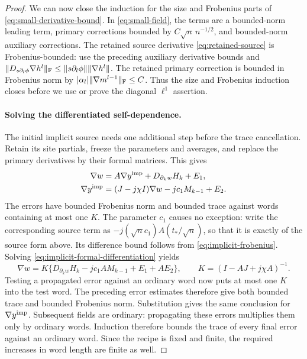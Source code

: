 \begin{proof}
We can now close the induction for the size and Frobenius parts of
\eqref{eq:small-derivative-bound}. In \eqref{eq:small-field}, the terms are a
bounded-norm leading term, primary corrections bounded by
$C\sqrt n\,n^{-1/2}$, and bounded-norm auxiliary corrections.
The retained source derivative \eqref{eq:retained-source} is
Frobenius-bounded: use the preceding auxiliary derivative bounds and
$\lVert D_{s\partial_l\phi}\nabla h^l\rVert_{\mathrm F}
\leq\lVert s\partial_l\phi\rVert\lVert \nabla h^l\rVert$.
The retained primary correction is bounded in Frobenius norm by
$|\alpha_l|\lVert \nabla m^{l-1}\rVert_{\mathrm F}\leq C$.
Thus the size and Frobenius induction closes before we use or prove
the diagonal $\ell^1$ assertion.

\paragraph{Solving the differentiated self-dependence.}
The initial implicit source needs one additional step before the trace
cancellation. Retain its site partials, freeze the parameters and
averages, and replace the primary derivatives by their formal matrices.
This gives
\begin{equation}
 \begin{split}
 \nabla w&=A\nabla y^{\rm imp}+D_{\partial_k w}H_k+E_1,\\
 \nabla y^{\rm imp}&=(J-j\chi I)\nabla w-jc_1M_{k-1}+E_2.
 \end{split}
 \label{eq:implicit-formal-differentiation}
\end{equation}
The errors have bounded Frobenius norm and bounded trace against words
containing at most one $K$.  The parameter $c_1$ causes no exception:
write the corresponding source term as
$-j(\sqrt n c_1)A(t_*/\sqrt n)$, so that it is exactly of the source
form above.  Its difference bound follows from
\eqref{eq:implicit-frobenius}.
Solving \eqref{eq:implicit-formal-differentiation} yields
\begin{equation}
 \nabla w
 =K\{D_{\partial_k w}H_k-jc_1AM_{k-1}+E_1+AE_2\},
 \qquad K=(I-AJ+j\chi A)^{-1}.
 \label{eq:implicit-derivative-solved}
\end{equation}
Testing a propagated error against an ordinary word now puts at most
one $K$ into the test word. The preceding error estimates therefore give
both bounded trace and bounded Frobenius norm. Substitution gives the same
conclusion for
$\nabla y^{\rm imp}$. Subsequent fields are ordinary: propagating these
errors multiplies
them only by ordinary words. Induction therefore bounds the trace of
every final error against an ordinary word. Since the recipe is fixed
and finite, the required increases in word length are finite as well.


\end{proof}
